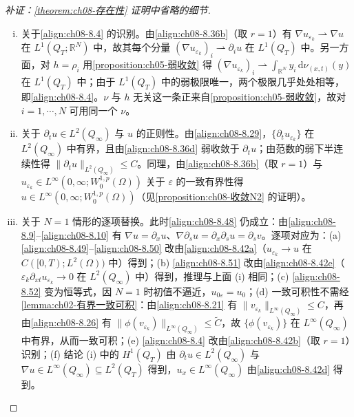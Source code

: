 \documentclass[../../main.tex]{subfiles}%
\begin{document}
\begin{proof}[补证：\cref{theorem:ch08-存在性} 证明中省略的细节]
\begin{enumerate}[(i)]
\item 关于\eqref{align:ch08-8.4} 的识别。由\eqref{align:ch08-8.36b}（取 $r=1$）有 $\nabla u_{\varepsilon_k}\rightharpoonup\nabla u$ 在 $L^1(Q_T;\mathbb{R}^N)$ 中，故其每个分量 $(\nabla u_{\varepsilon_k})_i\rightharpoonup\partial_iu$ 在 $L^1(Q_T)$ 中。另一方面，对 $h=\rho_i$ 用\cref{proposition:ch05-弱收敛} 得 $(\nabla u_{\varepsilon_k})_i\rightharpoonup\int_{\mathbb{R}^N}y_i\,\mathrm{d}\nu_{(x,t)}(y)$ 在 $L^1(Q_T)$ 中；由于 $L^1(Q_T)$ 中的弱极限唯一，两个极限几乎处处相等，即\eqref{align:ch08-8.4}。$\nu$ 与 $h$ 无关这一条正来自\cref{proposition:ch05-弱收敛}，故对 $i=1,\cdots ,N$ 可用同一个 $\nu$。
\item 关于 $\partial_tu\in L^2(Q_\infty)$ 与 $u$ 的正则性。由\eqref{align:ch08-8.29}，$\{\partial_tu_{\varepsilon_k}\}$ 在 $L^2(Q_\infty)$ 中有界，且由\eqref{align:ch08-8.36d} 弱收敛于 $\partial_tu$；由范数的弱下半连续性得 $\|\partial_tu\|_{L^2(Q_\infty)}\leqslant C$。同理，由\eqref{align:ch08-8.36b}（取 $r=1$）与 $u_{\varepsilon_k}\in L^\infty(0,\infty;W^{1,p}_0(\Omega))$ 关于 $\varepsilon$ 的一致有界性得 $u\in L^\infty(0,\infty;W^{1,p}_0(\Omega))$（见\cref{proposition:ch08-收敛N2} 的证明）。
\item 关于 $N=1$ 情形的逐项替换。此时\eqref{align:ch08-8.48} 仍成立：由\eqref{align:ch08-8.9}--\eqref{align:ch08-8.10} 有 $\nabla u=\partial_xu$、$\nabla\partial_su=\partial_x\partial_su=\partial_sv$。逐项对应为：(a) \eqref{align:ch08-8.49}--\eqref{align:ch08-8.50} 改由\eqref{align:ch08-8.42a}（$u_{\varepsilon_k}\to u$ 在 $C([0,T);L^2(\Omega))$ 中）得到；(b) \eqref{align:ch08-8.51} 改由\eqref{align:ch08-8.42e}（$\varepsilon_k\partial_{xt}u_{\varepsilon_k}\to0$ 在 $L^2(Q_\infty)$ 中）得到，推理与上面 (i) 相同；(c) \eqref{align:ch08-8.52} 变为恒等式，因 $N=1$ 时初值不逼近，$u_{0\varepsilon}=u_0$；(d) 一致可积性不需经\cref{lemma:ch02-有界一致可积}：由\eqref{align:ch08-8.21} 有 $\|v_{\varepsilon_k}\|_{L^\infty(Q_\infty)}\leqslant C$，再由\eqref{align:ch08-8.26} 有 $\|\phi(v_{\varepsilon_k})\|_{L^\infty(Q_\infty)}\leqslant\widetilde C$，故 $\{\phi(v_{\varepsilon_k})\}$ 在 $L^\infty(Q_\infty)$ 中有界，从而一致可积；(e) \eqref{align:ch08-8.4} 改由\eqref{align:ch08-8.42b}（取 $r=1$）识别；(f) 结论 (i) 中的 $H^1(Q_T)$ 由 $\partial_tu\in L^2(Q_\infty)$ 与 $\nabla u\in L^\infty(Q_\infty)\subseteq L^2(Q_T)$ 得到，$u_x\in L^\infty(Q_\infty)$ 由\eqref{align:ch08-8.42d} 得到。
\end{enumerate}
\end{proof}
\end{document}
